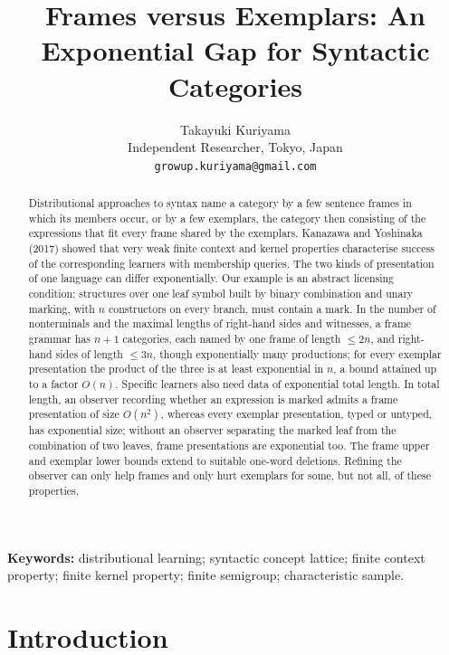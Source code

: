 \documentclass[11pt]{article}
\title{Frames versus Exemplars: An Exponential Gap for Syntactic Categories}
\author{Takayuki Kuriyama\\
Independent Researcher, Tokyo, Japan\\
\texttt{growup.kuriyama@gmail.com}}
\date{}
\numberwithin{equation}{section}
\theoremstyle{plain}
\theoremstyle{definition}
\theoremstyle{remark}
\theoremstyle{plain}
\begin{document}
\maketitle
\linenumbers

\begin{abstract}
Distributional approaches to syntax name a category by a few sentence
frames in which its members occur, or by a few exemplars, the category then
consisting of the expressions that fit every frame shared by the exemplars.
Kanazawa and Yoshinaka (2017) showed that very weak finite context and
kernel properties characterise success of the corresponding learners with
membership queries.  The two kinds of presentation of one language can
differ exponentially.  Our example is an abstract licensing condition:
structures over one leaf symbol built by binary combination and unary
marking, with $n$ constructors on every branch, must contain a mark.  In the
number of nonterminals and the maximal lengths of right-hand sides and
witnesses, a frame grammar has $n+1$ categories, each named by one frame of
length $\le2n$, and right-hand sides of length $\le3n$, though exponentially
many productions; for every exemplar presentation the product of the three is at least
exponential in $n$, a bound attained up to a factor $O(n)$.  Specific
learners also need data of exponential total length.  In total length, an
observer recording whether an expression is marked admits a frame
presentation of size $O(n^2)$, whereas every exemplar presentation, typed
or untyped, has exponential size; without an observer separating the marked
leaf from the combination of two leaves, frame presentations are exponential
too.  The frame upper and exemplar lower bounds extend to suitable one-word
deletions.  Refining the observer can only help frames and only hurt
exemplars for some, but not all, of these properties.
\end{abstract}

\noindent\textbf{Keywords:} distributional learning; syntactic concept
lattice; finite context property; finite kernel property; finite
semigroup; characteristic sample.

\section{Introduction}\label{sec:intro}
\end{document}
